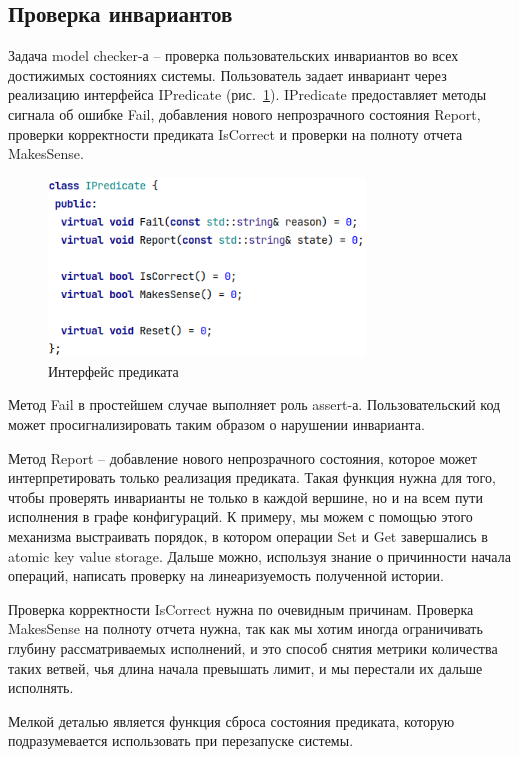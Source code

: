 \subsection{Проверка инвариантов}

Задача model checker-а – проверка пользовательских инвариантов во всех достижимых состояниях системы. Пользователь задает инвариант через реализацию интерфейса IPredicate (рис.~\ref{fig:predicate}). IPredicate предоставляет методы сигнала об ошибке Fail, добавления нового непрозрачного состояния Report, проверки корректности предиката IsCorrect и проверки на полноту отчета MakesSense.

\begin{figure}[h]
    \centering
    \includegraphics[width=0.75\textwidth]{img/predicate.png}
    \caption{Интерфейс предиката}
    \label{fig:predicate}
\end{figure}

Метод Fail в простейшем случае выполняет роль assert-а. Пользовательский код может просигнализировать таким образом о нарушении инварианта.

Метод Report – добавление нового непрозрачного состояния, которое может интерпретировать только реализация предиката. Такая функция нужна для того, чтобы проверять инварианты не только в каждой вершине, но и на всем пути исполнения в графе конфигураций. К примеру, мы можем с помощью этого механизма выстраивать порядок, в котором операции Set и Get завершались в atomic key value storage. Дальше можно, используя знание о причинности начала операций, написать проверку на линеаризуемость полученной истории.

Проверка корректности IsCorrect нужна по очевидным причинам. Проверка MakesSense на полноту отчета нужна, так как мы хотим иногда ограничивать глубину рассматриваемых исполнений, и это способ снятия метрики количества таких ветвей, чья длина начала превышать лимит, и мы перестали их дальше исполнять.

Мелкой деталью является функция сброса состояния предиката, которую подразумевается использовать при перезапуске системы.
